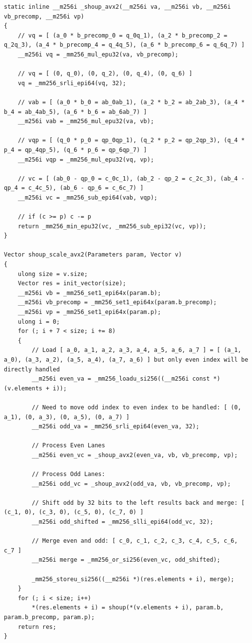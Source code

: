 \documentclass{article}
\begin{document}
\begin{lstlisting}[caption = Variant 1 (AVX2), label = {list:variant1_avx2}]
static inline __m256i _shoup_avx2(__m256i va, __m256i vb, __m256i vb_precomp, __m256i vp)
{
    // vq = [ (a_0 * b_precomp_0 = q_0q_1), (a_2 * b_precomp_2 = q_2q_3), (a_4 * b_precomp_4 = q_4q_5), (a_6 * b_precomp_6 = q_6q_7) ]
    __m256i vq = _mm256_mul_epu32(va, vb_precomp);

    // vq = [ (0, q_0), (0, q_2), (0, q_4), (0, q_6) ]
    vq = _mm256_srli_epi64(vq, 32);

    // vab = [ (a_0 * b_0 = ab_0ab_1), (a_2 * b_2 = ab_2ab_3), (a_4 * b_4 = ab_4ab_5), (a_6 * b_6 = ab_6ab_7) ]
    __m256i vab = _mm256_mul_epu32(va, vb);

    // vqp = [ (q_0 * p_0 = qp_0qp_1), (q_2 * p_2 = qp_2qp_3), (q_4 * p_4 = qp_4qp_5), (q_6 * p_6 = qp_6qp_7) ]
    __m256i vqp = _mm256_mul_epu32(vq, vp);

    // vc = [ (ab_0 - qp_0 = c_0c_1), (ab_2 - qp_2 = c_2c_3), (ab_4 - qp_4 = c_4c_5), (ab_6 - qp_6 = c_6c_7) ]
    __m256i vc = _mm256_sub_epi64(vab, vqp);

    // if (c >= p) c -= p
    return _mm256_min_epu32(vc, _mm256_sub_epi32(vc, vp));
}

Vector shoup_scale_avx2(Parameters param, Vector v)
{
    ulong size = v.size;
    Vector res = init_vector(size);
    __m256i vb = _mm256_set1_epi64x(param.b);
    __m256i vb_precomp = _mm256_set1_epi64x(param.b_precomp);
    __m256i vp = _mm256_set1_epi64x(param.p);
    ulong i = 0;
    for (; i + 7 < size; i += 8)
    {
        // Load [ a_0, a_1, a_2, a_3, a_4, a_5, a_6, a_7 ] = [ (a_1, a_0), (a_3, a_2), (a_5, a_4), (a_7, a_6) ] but only even index will be directly handled
        __m256i even_va = _mm256_loadu_si256((__m256i const *)(v.elements + i));

        // Need to move odd index to even index to be handled: [ (0, a_1), (0, a_3), (0, a_5), (0, a_7) ]
        __m256i odd_va = _mm256_srli_epi64(even_va, 32);

        // Process Even Lanes
        __m256i even_vc = _shoup_avx2(even_va, vb, vb_precomp, vp);

        // Process Odd Lanes:
        __m256i odd_vc = _shoup_avx2(odd_va, vb, vb_precomp, vp);

        // Shift odd by 32 bits to the left results back and merge: [ (c_1, 0), (c_3, 0), (c_5, 0), (c_7, 0) ]
        __m256i odd_shifted = _mm256_slli_epi64(odd_vc, 32);

        // Merge even and odd: [ c_0, c_1, c_2, c_3, c_4, c_5, c_6, c_7 ]
        __m256i merge = _mm256_or_si256(even_vc, odd_shifted);

        _mm256_storeu_si256((__m256i *)(res.elements + i), merge);
    }
    for (; i < size; i++)
        *(res.elements + i) = shoup(*(v.elements + i), param.b, param.b_precomp, param.p);
    return res;
}
\end{lstlisting}
\end{document}
